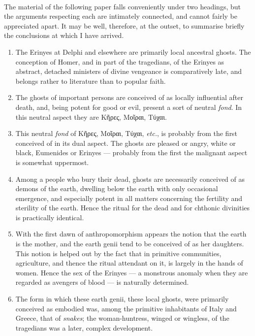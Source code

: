 \documentclass[a4paper, 11pt, oneside, polutonikogreek, english]{article}
\begin{document}
\paragraph{}
The material of the following paper falls conveniently under two headings, but the arguments respecting each are intimately connected, and cannot fairly be appreciated apart. It may be well, therefore, at the outset, to summarise briefly the conclusions at which I have arrived.
\begin{enumerate}
    \item The Erinyes at Delphi and elsewhere are primarily local ancestral ghosts. The conception of Homer, and in part of the tragedians, of the Erinyes as abstract, detached ministers of divine vengeance is comparatively late, and belongs rather to literature than to popular faith.

    \item The ghosts of important persons are conceived of as locally influential after death, and, being potent for good or evil, present a sort of neutral \emph{fond}. In this neutral aspect they are Κῆρες, Μοῖραι, Τύχαι.

    \item This neutral \emph{fond} of Κῆρες, Μοῖραι, Τύχαι, \emph{etc.}, is probably from the first conceived of in its dual aspect. The ghosts are pleased or angry, white or black, Eumenides or Erinyes --- probably from the first the malignant aspect is somewhat uppermost.

    \item Among a people who bury their dead, ghosts are necessarily conceived of as demons of the earth, dwelling below the earth with only occasional emergence, and especially potent in all matters concerning the fertility and sterility of the earth. Hence the ritual for the dead and for chthonic divinities is practically identical.

    \item With the first dawn of anthropomorphism appears the notion that the earth is the mother, and the earth genii tend to be conceived of as her daughters. This notion is helped out by the fact that in primitive communities, agriculture, and thence the ritual attendant on it, is largely in the hands of women. Hence the sex of the Erinyes --- a monstrous anomaly when they are regarded as avengers of blood --- is naturally determined.

    \item The form in which these earth genii, these local ghosts, were primarily conceived as embodied was, among the primitive inhabitants of Italy and Greece, that of \emph{snakes}; the woman-huntress, winged or wingless, of the tragedians was a later, complex development.


\end{enumerate}
\end{document}
